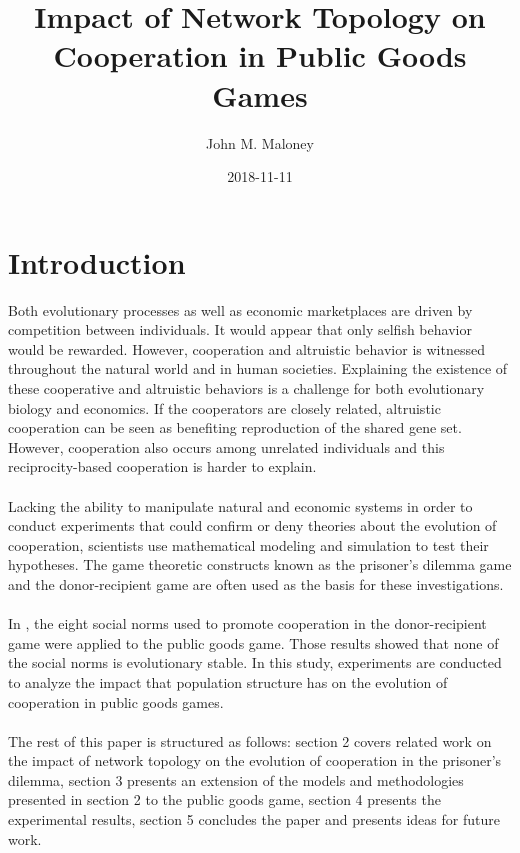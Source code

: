 \documentclass{article}
\title{Impact of Network Topology on Cooperation in Public Goods Games}
\date{2018-11-11}
\author{John M. Maloney}
\begin{document}
  \maketitle

  \section{Introduction}
  Both evolutionary processes as well as economic marketplaces are driven by competition between individuals. It would appear that only selfish behavior would be rewarded.  However, cooperation and altruistic behavior is witnessed throughout the natural world and in human societies.  Explaining the existence of these cooperative and altruistic behaviors is a challenge for both evolutionary biology and economics.  If the cooperators are closely related, altruistic cooperation can be seen as benefiting reproduction of the shared gene set.  However, cooperation also occurs among unrelated individuals and this reciprocity-based cooperation is harder to explain.
  \paragraph{}Lacking the ability to manipulate natural and economic systems in order to conduct experiments that could confirm or deny theories about the evolution of cooperation, scientists use mathematical modeling and simulation to test their hypotheses.  The game theoretic constructs known as the prisoner's dilemma game and the donor-recipient game are often used as the basis for these investigations.
  \paragraph{}In \cite{Maloney2015a}, the eight social norms used to promote cooperation in the donor-recipient game \cite{Ohtsuki2006} were applied to the public goods game.  Those results showed that none of the social norms is evolutionary stable.  In this study, experiments are conducted to analyze the impact that population structure has on the evolution of cooperation in public goods games.
  \paragraph{}The rest of this paper is structured as follows:  section 2 covers related work on the impact of network topology on the evolution of cooperation in the prisoner's dilemma, section 3 presents an extension of the models and methodologies presented in section 2 to the public goods game, section 4 presents the experimental results, section 5 concludes the paper and presents ideas for future work.
  
\end{document}
